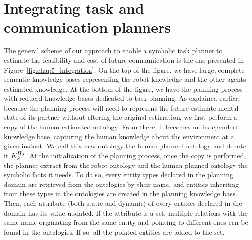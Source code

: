 \section[Integrating planners]{Integrating task and communication planners}

The general scheme of our approach to enable a symbolic task planner to estimate the feasibility and cost of future communication is the one presented in Figure~\ref{fig:chap5_integration}. On the top of the figure, we have large, complete semantic knowledge bases representing the robot knowledge and the other agents estimated knowledge. At the bottom of the figure, we have the planning process with reduced knowledge bases dedicated to task planning. As explained earlier, because the planning process will need to represent the future estimate mental state of its partner without altering the original estimation, we first perform a copy of the human estimated ontology. From there, it becomes an independent knowledge base, capturing the human knowledge about the environment at a given instant. We call this new ontology the human planned ontology and denote it $K_S^{H_0}$. At the initialization of the planning process, once the copy is performed, the planner extract from the robot ontology and the human planned ontology the symbolic facts it needs. To do so, every entity types declared in the planning domain are retrieved from the ontologies by their name, and entities inheriting from these types in the ontologies are created in the planning knowledge base. Then, each attribute (both static and dynamic) of every entities declared in the domain has its value updated. If the attribute is a set, multiple relations with the same name originating from the same entity and pointing to different ones can be found in the ontologies. If so, all the pointed entities are added to the set.

